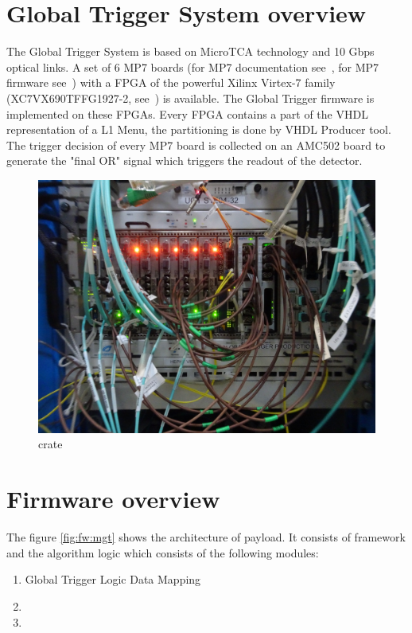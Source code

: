 \section{Global Trigger System overview}\label{sec:fw:gt_system}

The Global Trigger System is based on MicroTCA technology and 10 Gbps optical links. A set of 6 MP7 boards (for MP7 documentation see~\cite{MP7}, for MP7 firmware see~\cite{MP7 firmware}) with a FPGA of the powerful Xilinx Virtex-7 family (XC7VX690TFFG1927-2, see~\cite{Virtex7}) is available. The Global Trigger firmware is implemented on these FPGAs. Every FPGA contains a part of the VHDL representation of a L1 Menu, the partitioning is done by VHDL Producer tool. The trigger decision of every MP7 board is collected on an AMC502 board to generate the "final OR" signal which triggers the readout of the detector.

\begin{figure}[h!]
   \centering
    \includegraphics[width=1.0\textwidth]{figures/prodcrate_DSC09437.jpeg}
    \caption{\ugt crate}\label{fig:fw:mgt_crate}
\end{figure}

\section{Firmware overview}\label{sec:fw:fw}
The figure \ref{fig:fw:mgt} shows the architecture of \ugt payload. It consists of framework and the algorithm logic which consists of the following modules:
\begin{enumerate}
\item Global Trigger Logic Data Mapping
\item \ugtl
\item \ufdl
\end{enumerate}

